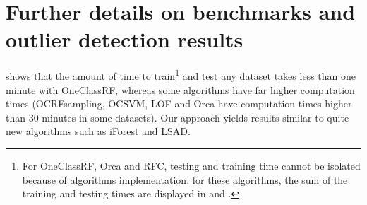 \section{Further details on benchmarks and outlier detection results}
\label{sup:outlier_detection}

 shows that the amount of time to
train\footnote{For \ac{OneClassRF}, Orca and \ac{RFC}, testing and training
time cannot be isolated because of algorithms implementation: for these
algorithms, the sum of the training and testing times are displayed in
 and .}
and test any dataset takes less than one minute with \ac{OneClassRF}, whereas
some algorithms have far higher computation times (\ac{OCRFsampling},
\ac{OCSVM}, \ac{LOF} and Orca have computation times higher than $30$ minutes
in some datasets). Our approach yields results similar to quite new algorithms
such as \ac{iForest} and \ac{LSAD}.
